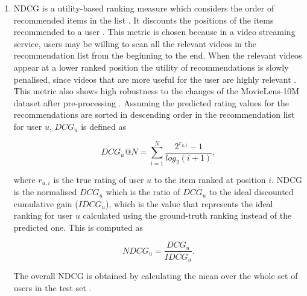 \documentclass[review]{elsarticle}
\begin{document}
\begin{enumerate}
    \item \ac{NDCG} is a utility-based ranking measure which considers the order of recommended items in the list \citep{lee2017large}. It discounts the positions of the items recommended to a user \citep{deldjoo2019movie}. This metric is chosen because in a video streaming service, users may be willing to scan all the relevant videos in the recommendation list from the beginning to the end. When the relevant videos appear at a lower ranked position the utility of recommendations is slowly penalised, since videos that are more useful for the user are highly relevant \citep{shani2011evaluating}. This metric also shows high robustness to the changes of the MovieLens-10M dataset after pre-processing \citep{tousch2019robust}. Assuming the predicted rating values for the recommendations are sorted in descending order in the recommendation list for user $u$, $DCG_u$ is defined as \citep{deldjoo2019movie, matveeva2006high}
    
    \begin{equation}
        DCG_u@N = \sum_{i=1}^{N} \frac{2^{r_{u,i}} - 1}{log_2(i+1)},
    \end{equation}
    
    
    where $r_{u,i}$ is the true rating of user $u$ to the item ranked at position $i$. \ac{NDCG} is the normalised $DCG_u$ which is the ratio of $DCG_u$ to the ideal discounted cumulative gain ($IDCG_u$), which is the value that represents the ideal ranking for user $u$ calculated using the ground-truth ranking instead of the predicted one. This is computed as \citep{deldjoo2019movie}
    
    \begin{equation}
        NDCG_u = \frac{DCG_u}{IDCG_u}.
    \end{equation}
    
    The overall \ac{NDCG} is obtained by calculating the mean over the whole set of users in the test set \citep{deldjoo2019movie}.\\
\end{enumerate}
\end{document}
